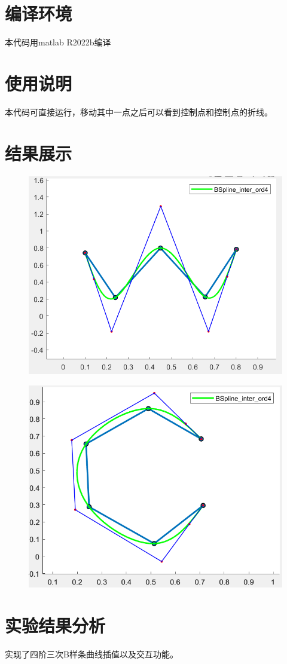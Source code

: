 \documentclass{article}
\begin{document}
\section{编译环境}
	本代码用matlab R2022b编译
\section{使用说明}
	本代码可直接运行，移动其中一点之后可以看到控制点和控制点的折线。
\section{结果展示}
	\begin{figure}[H]
		\centering
		\includegraphics{w}
		\caption{}
		\label{fig:w}
	\end{figure}
	\begin{figure}[H]
		\centering
		\includegraphics{c}
		\caption{}
		\label{fig:c}
	\end{figure}
\section{实验结果分析}
	实现了四阶三次B样条曲线插值以及交互功能。
\end{document}
